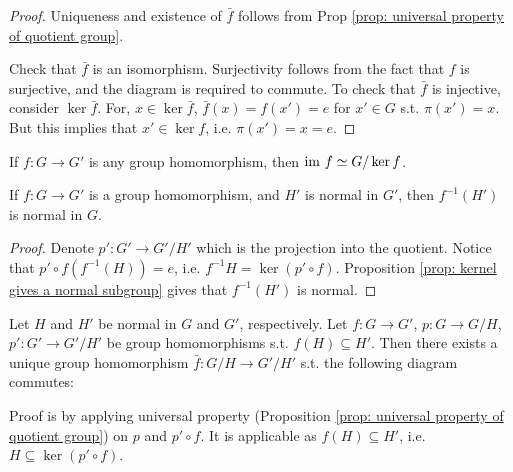 \documentclass{article}
\begin{document}
\begin{proof}
    Uniqueness and existence of $\bar{f}$ follows from Prop \ref{prop: universal property of quotient group}. 

    Check that $\bar{f}$ is an isomorphism. Surjectivity follows from the fact that $f$ is surjective, and the diagram is required to commute. To check that $\bar{f}$ is injective, consider $\ker \bar{f}$. For, $x \in \ker \bar{f}$, $\bar{f}(x) = f(x') = e$ for $x' \in G$ s.t. $\pi(x') = x$. But this implies that $x' \in \ker f$, i.e. $\pi(x') = x = e$.
\end{proof}

\begin{corollary}
    If $f: G \to G'$ is any group homomorphism, then $\mathrm{im}\  f \simeq G/\ker f$.
\end{corollary}

\begin{remark}
    If $f: G \to G'$ is a group homomorphism, and $H'$ is normal in $G'$, then $f^{-1}(H')$ is normal in $G$.
\end{remark}

\begin{proof}
    Denote $p': G' \to G'/H'$ which is the projection into the quotient. Notice that $p' \circ f (f^{-1}(H)) = e$, i.e. $f^{-1}H = \ker (p' \circ f)$. Proposition \ref{prop: kernel gives a normal subgroup} gives that $f^{-1}(H')$ is normal. 
\end{proof}

\begin{remark}\label{rmk: transformation between quotient on normal subgroups}
    Let $H$ and $H'$ be normal in $G$ and $G'$, respectively. Let $f: G \to G'$, $p: G \to G/H$, $p': G' \to G'/H'$ be group homomorphisms s.t. $f(H) \subseteq H'$. Then there exists a unique group homomorphism $\bar{f}: G/H \to G'/H'$ s.t. the following diagram commutes:
    
    \begin{minipage}{\linewidth}
        \centering
    \end{minipage}

    Proof is by applying universal property (Proposition \ref{prop: universal property of quotient group}) on $p$ and $p' \circ f$. It is applicable as $f(H) \subseteq H'$, i.e. $H \subseteq \ker (p' \circ f)$.
\end{remark}
\end{document}
